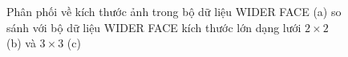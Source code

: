 {    \begin{figure}[H]
        \centering
        \caption{Phân phối về kích thước ảnh trong bộ dữ liệu WIDER FACE \cite{yang2016wider} (a) so sánh với bộ dữ liệu WIDER FACE kích thước lớn dạng lưới $2 \times 2$ (b) và $3 \times 3$ (c)}
        \label{fig:widerface_4k_img_size}
    \end{figure}

}
